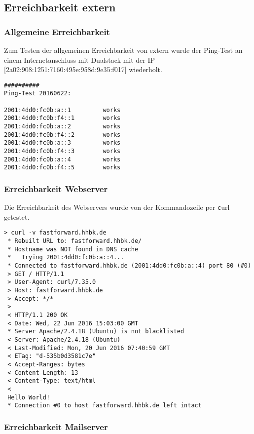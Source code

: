 \subsection{Erreichbarkeit extern}

\subsubsection{Allgemeine Erreichbarkeit}

Zum Testen der allgemeinen Erreichbarkeit von extern wurde der Ping-Test an einem Internetanschluss mit Dualstack mit der IP [2a02:908:1251:7160:495e:958d:9e35:f017] wiederholt.\newline

\begin{lstlisting}
##########
Ping-Test 20160622:

2001:4dd0:fc0b:a::1			works
2001:4dd0:fc0b:f4::1		works
2001:4dd0:fc0b:a::2			works
2001:4dd0:fc0b:f4::2		works
2001:4dd0:fc0b:a::3			works
2001:4dd0:fc0b:f4::3		works
2001:4dd0:fc0b:a::4			works
2001:4dd0:fc0b:f4::5		works
\end{lstlisting}

\subsubsection{Erreichbarkeit Webserver}

Die Erreichbarkeit des Webservers wurde von der Kommandozeile per {\texttt curl} getestet.\newline

\begin{lstlisting}[numbers=none]
> curl -v fastforward.hhbk.de
 * Rebuilt URL to: fastforward.hhbk.de/
 * Hostname was NOT found in DNS cache
 *   Trying 2001:4dd0:fc0b:a::4...
 * Connected to fastforward.hhbk.de (2001:4dd0:fc0b:a::4) port 80 (#0)
 > GET / HTTP/1.1
 > User-Agent: curl/7.35.0
 > Host: fastforward.hhbk.de
 > Accept: */*
 > 
 < HTTP/1.1 200 OK
 < Date: Wed, 22 Jun 2016 15:03:00 GMT
 * Server Apache/2.4.18 (Ubuntu) is not blacklisted
 < Server: Apache/2.4.18 (Ubuntu)
 < Last-Modified: Mon, 20 Jun 2016 07:40:59 GMT
 < ETag: "d-535b0d3581c7e"
 < Accept-Ranges: bytes
 < Content-Length: 13
 < Content-Type: text/html
 < 
 Hello World!
 * Connection #0 to host fastforward.hhbk.de left intact
\end{lstlisting}

\newpage
\subsubsection{Erreichbarkeit Mailserver}

